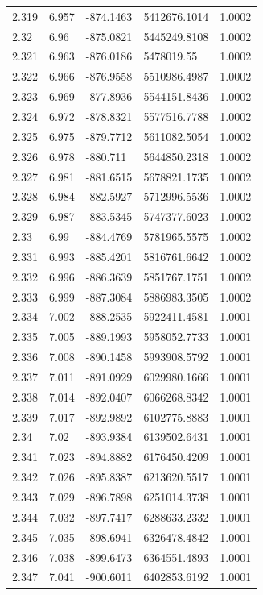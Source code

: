 \begin{tabular}{lllll}
2.319 & 6.957 & -874.1463 & 5412676.1014 & 1.0002 \\
2.32 & 6.96 & -875.0821 & 5445249.8108 & 1.0002 \\
2.321 & 6.963 & -876.0186 & 5478019.55 & 1.0002 \\
2.322 & 6.966 & -876.9558 & 5510986.4987 & 1.0002 \\
2.323 & 6.969 & -877.8936 & 5544151.8436 & 1.0002 \\
2.324 & 6.972 & -878.8321 & 5577516.7788 & 1.0002 \\
2.325 & 6.975 & -879.7712 & 5611082.5054 & 1.0002 \\
2.326 & 6.978 & -880.711 & 5644850.2318 & 1.0002 \\
2.327 & 6.981 & -881.6515 & 5678821.1735 & 1.0002 \\
2.328 & 6.984 & -882.5927 & 5712996.5536 & 1.0002 \\
2.329 & 6.987 & -883.5345 & 5747377.6023 & 1.0002 \\
2.33 & 6.99 & -884.4769 & 5781965.5575 & 1.0002 \\
2.331 & 6.993 & -885.4201 & 5816761.6642 & 1.0002 \\
2.332 & 6.996 & -886.3639 & 5851767.1751 & 1.0002 \\
2.333 & 6.999 & -887.3084 & 5886983.3505 & 1.0002 \\
2.334 & 7.002 & -888.2535 & 5922411.4581 & 1.0001 \\
2.335 & 7.005 & -889.1993 & 5958052.7733 & 1.0001 \\
2.336 & 7.008 & -890.1458 & 5993908.5792 & 1.0001 \\
2.337 & 7.011 & -891.0929 & 6029980.1666 & 1.0001 \\
2.338 & 7.014 & -892.0407 & 6066268.8342 & 1.0001 \\
2.339 & 7.017 & -892.9892 & 6102775.8883 & 1.0001 \\
2.34 & 7.02 & -893.9384 & 6139502.6431 & 1.0001 \\
2.341 & 7.023 & -894.8882 & 6176450.4209 & 1.0001 \\
2.342 & 7.026 & -895.8387 & 6213620.5517 & 1.0001 \\
2.343 & 7.029 & -896.7898 & 6251014.3738 & 1.0001 \\
2.344 & 7.032 & -897.7417 & 6288633.2332 & 1.0001 \\
2.345 & 7.035 & -898.6941 & 6326478.4842 & 1.0001 \\
2.346 & 7.038 & -899.6473 & 6364551.4893 & 1.0001 \\
2.347 & 7.041 & -900.6011 & 6402853.6192 & 1.0001 \\

\end{tabular}
